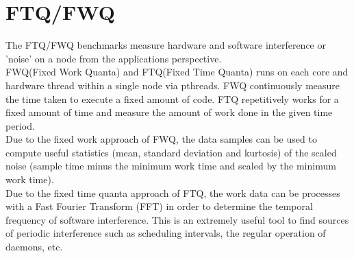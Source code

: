 \section{FTQ/FWQ}

The FTQ/FWQ benchmarks measure hardware and software interference or 'noise' on a node from the applications perspective.\\
FWQ(Fixed Work Quanta) and FTQ(Fixed Time Quanta) runs on each core and hardware thread within a single node via pthreads. FWQ continuously  measure the time taken to execute a fixed amount of code. FTQ repetitively works for a fixed amount of time and measure the amount of work done in the given time period.\\
Due to the fixed work approach of FWQ, the data samples can be used to compute useful statistics (mean, standard deviation and kurtosis) of the scaled noise (sample time minus the minimum work time and scaled by the minimum work time). \\
Due to the fixed time quanta approach of FTQ, the work data can be processes with a Fast Fourier Transform (FFT) in order to determine the temporal frequency of software interference.  This is an extremely useful tool to find sources of periodic interference such as scheduling intervals, the regular operation of daemons, etc. 
